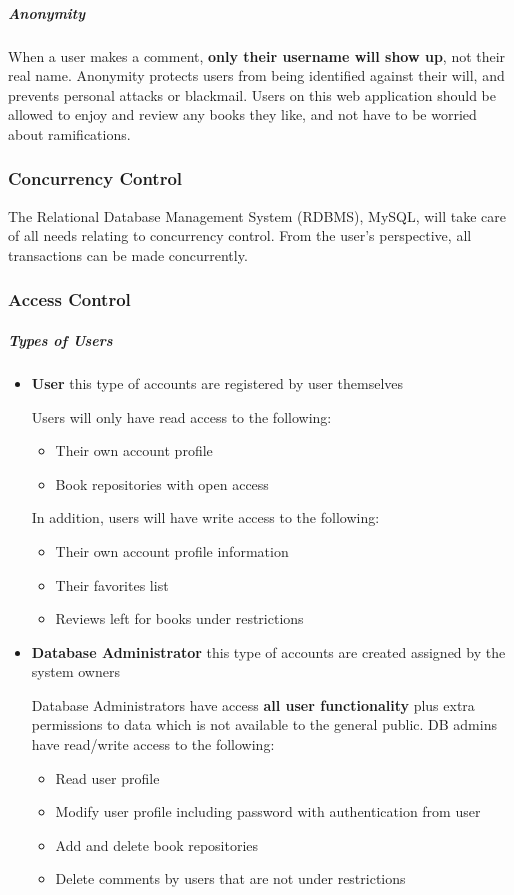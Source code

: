 \documentclass[letter, 12pt, titlepage]{article}
\begin{document}
\subparagraph{Anonymity}
When a user makes a comment, \textbf{only their username will show up}, not their real name. Anonymity protects users from being identified against their will, and prevents personal attacks or blackmail. Users on this web application should be allowed to enjoy and review any books they like, and not have to be worried about ramifications.

\subsubsection{Concurrency Control}
The Relational Database Management System (RDBMS), MySQL, will take care of all needs relating to concurrency control. From the user's perspective, all transactions can be made concurrently.

\subsubsection{Access Control}

\subparagraph{Types of Users}
\begin{itemize}
	\item \textbf{User}
	      this type of accounts are registered by user themselves


	      Users will only have read access to the following:
	      \begin{itemize}
		      \item  Their own account profile
		      \item  Book repositories with open access
	      \end{itemize}


	      In addition, users will have write access to the following:
	      \begin{itemize}
		      \item  Their own account profile information
		      \item  Their favorites list
		      \item  Reviews left for books under restrictions
	      \end{itemize}

	\item \textbf{Database Administrator}
	      this type of accounts are created assigned by the system owners


	      Database Administrators have access \textbf{all user functionality} plus extra permissions to data which is not available to the general public. DB admins have read/write access to the following:
	      \begin{itemize}
		      \item Read user profile
		      \item Modify user profile including password with authentication from user
		      \item Add and delete book repositories
		      \item Delete comments by users that are not under restrictions
	      \end{itemize}
\end{itemize}
\end{document}
